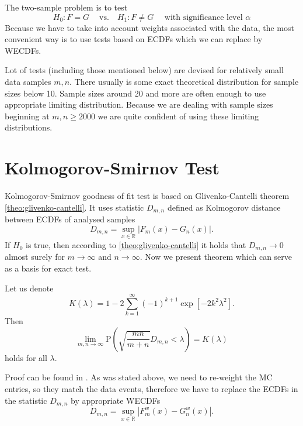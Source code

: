
The two-sample problem is to test
\begin{equation}
H_0: F = G \quad\: \text{vs.}\quad H_1: F \neq G \quad\text{ with significance level } \alpha
\end{equation} 
Because we have to take into account weights associated with the data, the most convenient way is to use tests based on ECDFs which we can replace by WECDFs. 

Lot of tests (including those mentioned below) are devised for relatively small data samples $m,n$. There usually is some exact theoretical distribution for sample sizes below 10. Sample sizes around 20 and more are often enough to use appropriate limiting distribution. Because we are dealing with sample sizes beginning at $m,n \geq 2000$ we are quite confident of using these limiting distributions.

\section{Kolmogorov-Smirnov Test}
Kolmogorov-Smirnov goodness of fit test is based on Glivenko-Cantelli theorem \ref{theo:glivenko-cantelli}. It uses statistic $D_{m,n}$ defined as Kolmogorov distance between ECDFs of analysed samples
\begin{equation}
D_{m,n} = \sup_{x \in \mathbb{R}} |F_m(x) - G_n(x)|.
\end{equation}
If $H_0$ is true, then according to \ref{theo:glivenko-cantelli} it holds that $D_{m,n} \rightarrow 0$ almost surely for $m \rightarrow \infty$ and $n \rightarrow \infty$. Now we present theorem which can serve as a basis for exact test.

\begin{theorem}[Smirnov]
	Let us denote  
	\begin{equation}
	K(\lambda) = 1 - 2\sum_{k=1}^{\infty} (-1)^{k+1} \exp\left[ -2k^2\lambda^2\right].
	\end{equation}
	Then 
	\begin{equation}
	\lim_{m,n \rightarrow \infty} \mathrm{P}(\sqrt{\frac{mn}{m+n}}D_{m,n} < \lambda) = K(\lambda)
	\end{equation}
	holds for all $\lambda$.
\end{theorem}
\noindent Proof can be found in \cite{Smirnov1944}. 
As was stated above, we need to re-weight the MC entries, so they match the data events, therefore we have to replace the ECDFs in the statistic $D_{m,n}$ by appropriate WECDFs
\begin{equation}
D_{m,n} = \sup_{x \in \mathbb{R}} |F^w_m(x) - G^w_n(x)|.
\end{equation}

